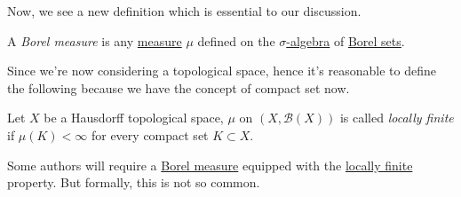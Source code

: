 Now, we see a new definition which is essential to our discussion.

\begin{definition}\label{def:Borel-measure}
	A \emph{Borel measure} is any \hyperref[def:measure]{measure} \(\mu\) defined on the \hyperref[def:sigma-algebra]{\(\sigma\)-algebra} of \hyperref[def:Borel-set]{Borel sets}.
\end{definition}

Since we're now considering a topological space, hence it's reasonable to define the following because we have the concept of compact set now.

\begin{definition}\label{def:locally-finite}
	Let \(X\) be a Hausdorff topological space, \(\mu\) on \((X, \mathcal{B} (X))\) is called \emph{locally finite} if \(\mu (K)<\infty \) for every compact set \(K\subset X\).
\end{definition}

\begin{note}
	Some authors will require a \hyperref[def:Borel-measure]{Borel measure} equipped with the \hyperref[def:locally-finite]{locally finite} property. But formally, this is not so common.
\end{note}

